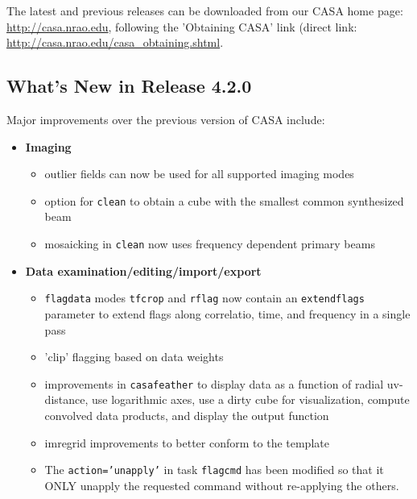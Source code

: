 The latest and previous releases can be downloaded from our CASA home
page: \url{http://casa.nrao.edu}, following the 'Obtaining CASA'
link (direct link: \url{http://casa.nrao.edu/casa_obtaining.shtml}.






\subsection{What's New in Release 4.2.0}
\label{section:intro.release.whatsnew}


Major improvements over the previous version of CASA include:
\begin{itemize}


\item  {\bf Imaging}
  \begin{itemize} 
   \item  outlier fields can now be used for all supported imaging modes 
   \item  option for {\tt clean} to obtain a cube with the smallest common synthesized beam 
   \item  mosaicking in {\tt clean} now uses frequency dependent primary beams
\end{itemize} 


\item  {\bf Data examination/editing/import/export}
   \begin{itemize} 

   \item  {\tt flagdata} modes {\tt tfcrop} and {\tt rflag} now contain an {\tt extendflags} parameter to extend flags along correlatio, time, and frequency in a single pass
   \item  'clip' flagging based on data weights
   \item  improvements in {\tt casafeather} to display data as a function of radial uv-distance, use logarithmic axes, use a dirty cube for visualization, compute convolved data products, and display the output function
   \item  imregrid improvements to better conform to the template
   \item  The {\tt action='unapply'} in task {\tt flagcmd} has been modified so that it ONLY unapply the requested command without re-applying the others.

     
\end{itemize} 


\end{itemize}
